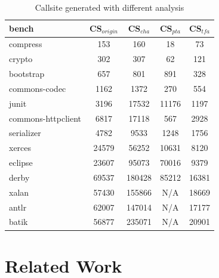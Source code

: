 \documentclass{llncs}
\begin{document}
\begin{table}[!htbp]\centering
\caption{Callsite generated with different analysis}
\begin{tabular}{lcccc}
	\hline
	\textbf{bench} & \textbf{CS$_{origin}$} & \textbf{CS$_{cha}$} & \textbf{CS$_{pta}$} & \textbf{CS$_{tfa}$} \\
	\hline
	compress & 153 & 160 & 18 & 73 \\
	crypto & 302 & 307 & 62 & 121 \\
	bootstrap & 657 & 801 & 891 & 328 \\
	commons-codec & 1162 & 1372 & 270 & 554 \\
	junit & 3196 & 17532 & 11176 & 1197 \\
	commons-httpclient & 6817 & 17118 & 567 & 2928 \\
	serializer & 4782 & 9533 & 1248 & 1756 \\
	xerces & 24579 & 56252 & 10631 & 8120 \\
	eclipse & 23607 & 95073 & 70016 & 9379 \\
	derby & 69537 & 180428 & 85212 & 16381 \\
	xalan & 57430 & 155866 & N/A & 18669 \\
	antlr & 62007 & 147014 & N/A & 17177 \\
	batik & 56877 & 235071 & N/A & 20901 \\
	\hline
\end{tabular}
\label{experiment:Callsite}
\end{table}

\section{Related Work}\label{sec:related-work}





\end{document}
